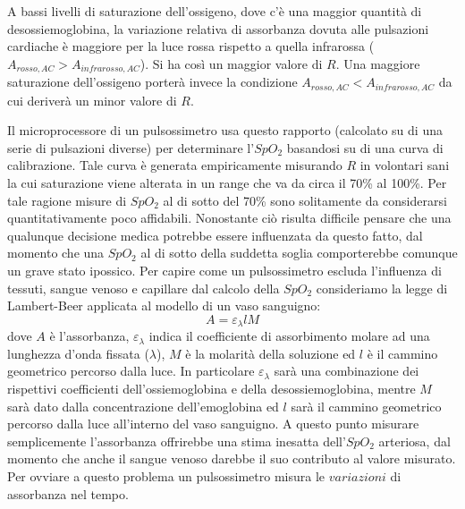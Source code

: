 \documentclass[a4paper, 12pt]{book}
\begin{document}
A bassi livelli di saturazione dell'ossigeno, dove c'è una maggior quantità di desossiemoglobina, la variazione relativa di assorbanza dovuta alle pulsazioni cardiache è maggiore per la luce rossa rispetto a quella infrarossa ($A_{rosso,AC}>A_{infrarosso,AC}$).
Si ha così un maggior valore di $R$.
Una maggiore saturazione dell'ossigeno porterà invece la condizione $A_{rosso,AC}<A_{infrarosso,AC}$ da cui deriverà un minor valore di $R$.
\newline

Il microprocessore di un pulsossimetro usa questo rapporto (calcolato su di una serie di pulsazioni diverse) per determinare l'$SpO_{2}$ basandosi su di una curva di calibrazione.
Tale curva è generata empiricamente misurando $R$ in volontari sani la cui saturazione viene alterata in un range che va da circa il 70\% al 100\%.
Per tale ragione misure di $SpO_{2}$ al di sotto del 70\% sono solitamente da considerarsi quantitativamente poco affidabili.
Nonostante ciò risulta difficile pensare che una qualunque decisione medica potrebbe essere influenzata da questo fatto, dal momento che una $SpO_{2}$ al di sotto della suddetta soglia comporterebbe comunque un grave stato ipossico.
Per capire come un pulsossimetro escluda l'influenza di tessuti, sangue venoso e capillare dal calcolo della $SpO_{2}$ consideriamo la legge di Lambert-Beer applicata al modello di un vaso sanguigno:
\begin{equation}
    \label{eq:Legge di Lambert-Beer}
    A = \varepsilon_{\lambda}lM
\end{equation}
dove $A$ è l'assorbanza, $\varepsilon_{\lambda}$ indica il coefficiente di assorbimento molare ad una lunghezza d'onda fissata ($\lambda$), $M$ è la molarità della soluzione ed $l$ è il cammino geometrico percorso dalla luce.
In particolare  $\varepsilon_{\lambda}$ sarà una combinazione dei rispettivi coefficienti dell'ossiemoglobina e della desossiemoglobina, mentre $M$ sarà dato dalla concentrazione dell'emoglobina ed $l$ sarà il cammino geometrico percorso dalla luce all'interno del vaso sanguigno.
A questo punto misurare semplicemente l'assorbanza offrirebbe una stima inesatta dell'$SpO_2$ arteriosa, dal momento che anche il sangue venoso darebbe il suo contributo al valore misurato.
Per ovviare a questo problema un pulsossimetro misura le $variazioni$ di assorbanza nel tempo.
\newline
\end{document}
